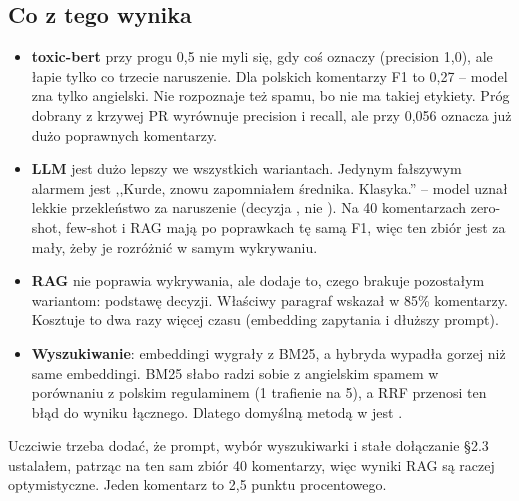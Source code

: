 \subsection{Co z tego wynika}

\begin{itemize}
  \item \textbf{toxic-bert} przy progu 0,5 nie myli się, gdy coś oznaczy (precision 1,0), ale łapie tylko co trzecie
        naruszenie. Dla polskich komentarzy F1 to 0,27 -- model zna tylko angielski. Nie rozpoznaje też spamu, bo
        nie ma takiej etykiety. Próg dobrany z krzywej PR wyrównuje precision i recall, ale przy 0,056 oznacza już
        dużo poprawnych komentarzy.
  \item \textbf{LLM} jest dużo lepszy we wszystkich wariantach. Jedynym fałszywym alarmem jest
        ,,Kurde, znowu zapomniałem średnika. Klasyka.'' -- model uznał lekkie przekleństwo za naruszenie (decyzja
        , nie ). Na 40 komentarzach zero-shot, few-shot i RAG mają po poprawkach tę samą
        F1, więc ten zbiór jest za mały, żeby je rozróżnić w samym wykrywaniu.
  \item \textbf{RAG} nie poprawia wykrywania, ale dodaje to, czego brakuje pozostałym wariantom: podstawę decyzji.
        Właściwy paragraf wskazał w 85\% komentarzy. Kosztuje to dwa razy więcej czasu (embedding zapytania i dłuższy
        prompt).
  \item \textbf{Wyszukiwanie}: embeddingi wygrały z BM25, a hybryda wypadła gorzej niż same embeddingi. BM25 słabo
        radzi sobie z angielskim spamem w porównaniu z polskim regulaminem (1 trafienie na 5), a RRF przenosi ten
        błąd do wyniku łącznego. Dlatego domyślną metodą w  jest .
\end{itemize}

Uczciwie trzeba dodać, że prompt, wybór wyszukiwarki i stałe dołączanie §2.3 ustalałem, patrząc na ten sam zbiór
40 komentarzy, więc wyniki RAG są raczej optymistyczne. Jeden komentarz to 2,5 punktu procentowego.
